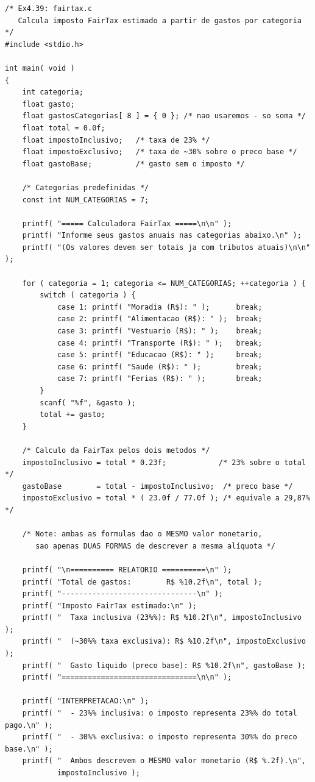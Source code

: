\documentclass[12pt,a4paper]{article}
\begin{document}
\begin{respostabox}
\begin{lstlisting}
/* Ex4.39: fairtax.c
   Calcula imposto FairTax estimado a partir de gastos por categoria */
#include <stdio.h>

int main( void )
{
    int categoria;
    float gasto;
    float gastosCategorias[ 8 ] = { 0 }; /* nao usaremos - so soma */
    float total = 0.0f;
    float impostoInclusivo;   /* taxa de 23% */
    float impostoExclusivo;   /* taxa de ~30% sobre o preco base */
    float gastoBase;          /* gasto sem o imposto */

    /* Categorias predefinidas */
    const int NUM_CATEGORIAS = 7;

    printf( "===== Calculadora FairTax =====\n\n" );
    printf( "Informe seus gastos anuais nas categorias abaixo.\n" );
    printf( "(Os valores devem ser totais ja com tributos atuais)\n\n" );

    for ( categoria = 1; categoria <= NUM_CATEGORIAS; ++categoria ) {
        switch ( categoria ) {
            case 1: printf( "Moradia (R$): " );      break;
            case 2: printf( "Alimentacao (R$): " );  break;
            case 3: printf( "Vestuario (R$): " );    break;
            case 4: printf( "Transporte (R$): " );   break;
            case 5: printf( "Educacao (R$): " );     break;
            case 6: printf( "Saude (R$): " );        break;
            case 7: printf( "Ferias (R$): " );       break;
        }
        scanf( "%f", &gasto );
        total += gasto;
    }

    /* Calculo da FairTax pelos dois metodos */
    impostoInclusivo = total * 0.23f;            /* 23% sobre o total */
    gastoBase        = total - impostoInclusivo;  /* preco base */
    impostoExclusivo = total * ( 23.0f / 77.0f ); /* equivale a 29,87% */

    /* Note: ambas as formulas dao o MESMO valor monetario,
       sao apenas DUAS FORMAS de descrever a mesma alíquota */

    printf( "\n========== RELATORIO ==========\n" );
    printf( "Total de gastos:        R$ %10.2f\n", total );
    printf( "-------------------------------\n" );
    printf( "Imposto FairTax estimado:\n" );
    printf( "  Taxa inclusiva (23%%): R$ %10.2f\n", impostoInclusivo );
    printf( "  (~30%% taxa exclusiva): R$ %10.2f\n", impostoExclusivo );
    printf( "  Gasto liquido (preco base): R$ %10.2f\n", gastoBase );
    printf( "===============================\n\n" );

    printf( "INTERPRETACAO:\n" );
    printf( "  - 23%% inclusiva: o imposto representa 23%% do total pago.\n" );
    printf( "  - 30%% exclusiva: o imposto representa 30%% do preco base.\n" );
    printf( "  Ambos descrevem o MESMO valor monetario (R$ %.2f).\n",
            impostoInclusivo );


\end{lstlisting}
\end{respostabox}
\end{document}
